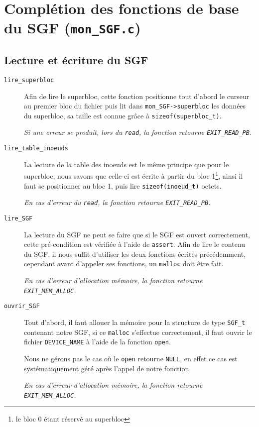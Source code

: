\documentclass[a4paper, 11pt]{article}
\begin{document}
	\maketitle
	\setcounter{secnumdepth}{2}
	\section{Complétion des fonctions de base du SGF (\texttt{mon\_SGF.c})}
		\subsection{Lecture et écriture du SGF}
		\begin{description}
			\item[\texttt{lire\_superbloc}] Afin de lire le superbloc, cette fonction positionne tout d'abord le curseur au premier bloc du fichier puis lit dans
				\texttt{mon\_SGF->superbloc} les données du superbloc, sa taille est connue grâce à \texttt{sizeof(superbloc\_t)}. 

				\textit{Si une erreur se produit, lors du \texttt{read}, la fonction retourne \texttt{EXIT\_READ\_PB}.}
			\item[\texttt{lire\_table\_inoeuds}] La lecture de la table des inoeuds est le même principe que pour le superbloc, nous savons que celle-ci est écrite
				à partir du bloc 1\footnote{le bloc 0 étant réservé au superbloc}, ainsi il faut se positionner au bloc 1, puis lire \texttt{sizeof(inoeud\_t)}
				octets. 
				
				\textit{En cas d'erreur du \texttt{read}, la fonction retourne \texttt{EXIT\_READ\_PB}.}
			\item[\texttt{lire\_SGF}] La lecture du SGF ne peut se faire que si le SGF est ouvert correctement, cette pré-condition est vérifiée à l'aide de
				\texttt{assert}. Afin de lire le contenu du SGF, il nous suffit d'utiliser les deux fonctions écrites précédemment, cependant avant d'appeler
				ses fonctions, un \texttt{malloc} doit être fait. 
				
				\textit{En cas d'erreur d'allocation mémoire, la fonction retourne \texttt{EXIT\_MEM\_ALLOC}.}
			\item[\texttt{ouvrir\_SGF}] Tout d'abord, il faut allouer la mémoire pour la structure de type \texttt{SGF\_t} contenant notre SGF, si ce
				\texttt{malloc} s'effectue correctement, il faut ouvrir le fichier \texttt{DEVICE\_NAME} à l'aide de la fonction \texttt{open}.

				Nous ne gérons pas le cas où le \texttt{open} retourne \texttt{NULL}, en effet ce cas est systématiquement géré après l'appel de notre fonction.

				\textit{En cas d'erreur d'allocation mémoire, la fonction retourne \texttt{EXIT\_MEM\_ALLOC}.}
		\end{description}
\end{document}
